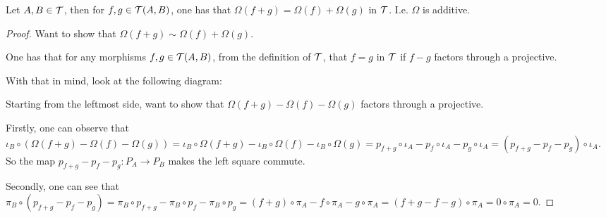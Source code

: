 \begin{lemma}
    Let \( A, B \in {\mathcal{T}} \), then for \( f, g \in {\mathcal{T}}(A, B) \), one has that \( \Omega(f + g) = \Omega(f) + \Omega(g) \) in \( {\mathcal{T}} \). I.e. \( \Omega \) is additive.
\end{lemma}
\begin{proof}
    Want to show that \( \Omega(f + g) \sim \Omega(f) + \Omega(g) \).
    
    One has that for any morphisms \( f, g \in {\mathcal{T}}(A, B) \), from the definition of \( {\mathcal{T}} \), that \( f = g \) in \( {\mathcal{T}} \) if \( f - g \) factors through a projective.

    With that in mind, look at the following diagram:

    \begin{center}
    \end{center}

    Starting from the leftmost side, want to show that \( \Omega(f + g) - \Omega(f) - \Omega(g) \) factors through a projective.

    Firstly, one can observe that \( \iota_B \circ (\Omega(f+g)-\Omega(f)-\Omega(g)) = \iota_B \circ \Omega(f + g) - \iota_B \circ \Omega(f) - \iota_B \circ \Omega(g) = p_{f + g} \circ \iota_A - p_{f} \circ \iota_A - p_{g} \circ \iota_A = (p_{f + g} - p_f - p_g) \circ \iota_A \). So the map \( p_{f + g} - p_f - p_g: P_A \to P_B \) makes the left square commute.
    
    Secondly, one can see that \( \pi_B \circ (p_{f + g} - p_f - p_g) = \pi_B \circ p_{f + g} - \pi_B \circ p_f - \pi_B \circ  p_g = (f + g) \circ \pi_A - f \circ \pi_A - g \circ \pi_A = (f + g - f - g) \circ \pi_A = 0 \circ \pi_A = 0 \). 
    

\end{proof}

